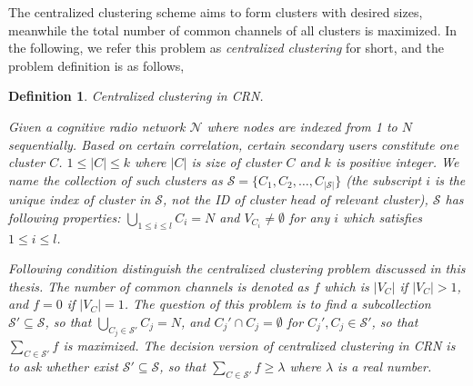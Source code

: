\documentclass[journal,comsoc]{IEEEtran}
\theoremstyle{mytheoremstyle}
\theoremstyle{mytheoremstyle}
\theoremstyle{mytheoremstyle}
\newtheorem{mydef}{Definition}%
\begin{document}


The centralized clustering scheme aims to form clusters with desired sizes, meanwhile the total number of common channels of all clusters is maximized.
In the following, we refer this problem as \textit{centralized clustering} for short, and the problem definition is as follows, 


\begin{mydef}
\label{def_centralized_clustering}
\textit{Centralized clustering in CRN.}

Given a cognitive radio network $\mathcal{N}$ where nodes are indexed from 1 to $N$ sequentially.
Based on certain correlation, certain secondary users constitute one cluster $C$.
$1\leq |C| \leqslant k$ where $|C|$ is size of cluster $C$ and $k$ is positive integer.
We name the collection of such clusters as $\mathcal{S}=\{C_1, C_2,\ldots,C_{|\mathcal{S}|}\}$ (the subscript $i$ is the unique index of cluster in $\mathcal{S}$, not the ID of cluster head of relevant cluster), $\mathcal{S}$ has following properties: $\bigcup_{1\leq i \leq l} C_i = N$ and $V_{C_i}\neq \emptyset$ for any $i$ which satisfies $1\leq i \leq l$.

Following condition distinguish the centralized clustering problem discussed in this thesis.
The number of common channels is denoted as $f$ which is $|V_{C}|$ if $|V_{C}|>1$, and $f=0$ if $|V_{C}|=1$.
The question of this problem is to find a subcollection $\mathcal{S}' \subseteq \mathcal{S}$, so that $\bigcup_{C_j\in \mathcal{S}'} C_j = N$, and $C_j'\cap C_j =\emptyset$ for $C_j', C_j\in \mathcal{S}'$, so that $\sum_{C\in \mathcal{S}'} f$ is maximized.
The decision version of centralized clustering in CRN is to ask whether exist $\mathcal{S}'\subseteq \mathcal{S}$, so that $\sum_{C\in \mathcal{S}'} f \geqslant \lambda$ where $\lambda$ is a real number.%
\end{mydef}


\end{document}
